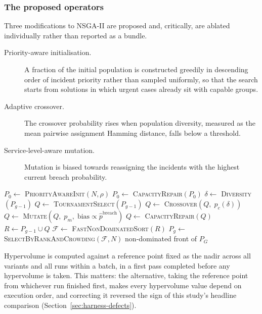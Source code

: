 \subsubsection{The proposed operators}

Three modifications to NSGA-II \citep{deb2002fast} are proposed and, critically, are ablated
individually rather than reported as a bundle.

\begin{description}
\item[Priority-aware initialisation.] A fraction of the initial population is constructed
greedily in descending order of incident priority rather than sampled uniformly, so that the
search starts from solutions in which urgent cases already sit with capable groups.
\item[Adaptive crossover.] The crossover probability rises when population diversity, measured
as the mean pairwise assignment Hamming distance, falls below a threshold.
\item[Service-level-aware mutation.] Mutation is biased towards reassigning the incidents with
the highest current breach probability.
\end{description}

\begin{algorithm}[htbp]
\caption{Priority-aware adaptive NSGA-II (PAA-NSGA-II). Differences from standard NSGA-II are
lines 1, 6 and 7.}
\label{alg:paa}
\begin{algorithmic}[1]
\State $P_0 \gets$ \textsc{PriorityAwareInit}$(N, \rho)$ 
\State $P_0 \gets$ \textsc{CapacityRepair}$(P_0)$
  \State $\delta \gets$ \textsc{Diversity}$(P_{g-1})$ 
  \State $Q \gets$ \textsc{TournamentSelect}$(P_{g-1})$
  \State $Q \gets$ \textsc{Crossover}$(Q, \; p_c(\delta))$ 
  \State $Q \gets$ \textsc{Mutate}$(Q, \; p_m,\; \text{bias} \propto \hat{p}^{\mathrm{breach}})$
  \State $Q \gets$ \textsc{CapacityRepair}$(Q)$
  \State $R \gets P_{g-1} \cup Q$
  \State $\mathcal{F} \gets$ \textsc{FastNonDominatedSort}$(R)$ 
  \State $P_g \gets$ \textsc{SelectByRankAndCrowding}$(\mathcal{F}, N)$
\EndFor
\State \Return non-dominated front of $P_G$
\end{algorithmic}
\end{algorithm}

Hypervolume is computed against a reference point fixed as the nadir across all variants and all
runs within a batch, in a first pass completed before any hypervolume is taken. This matters:
the alternative, taking the reference point from whichever run finished first, makes every
hypervolume value depend on execution order, and correcting it reversed the sign of this study's
headline comparison (Section~\ref{sec:harness-defects}).
